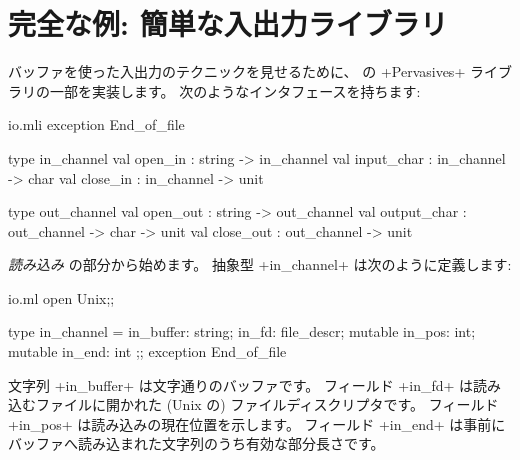 \section{完全な例: 簡単な入出力ライブラリ}

バッファを使った入出力のテクニックを見せるために、
\ocaml の \ml+Pervasives+ ライブラリの一部を実装します。 次のようなインタフェースを持ちます:
%
\begin{listingcodefile}{io.mli}
exception End_of_file

type in_channel
val open_in : string -> in_channel
val input_char : in_channel -> char
val close_in : in_channel -> unit

type out_channel
val open_out : string -> out_channel
val output_char : out_channel -> char -> unit
val close_out : out_channel -> unit
\end{listingcodefile}
%
\emph{読み込み} の部分から始めます。
抽象型 \ml+in_channel+ は次のように定義します:
%
\begin{listingcodefile}{io.ml}
open Unix;;

type in_channel =
  { in_buffer: string;
    in_fd: file_descr;
    mutable in_pos: int;
    mutable in_end: int };;
exception End_of_file
\end{listingcodefile}
%
文字列 \ml+in_buffer+ は文字通りのバッファです。
フィールド \ml+in_fd+ は読み込むファイルに開かれた (Unix の) ファイルディスクリプタです。
フィールド \ml+in_pos+ は読み込みの現在位置を示します。
フィールド \ml+in_end+ は事前にバッファへ読み込まれた文字列のうち有効な部分長さです。
%
